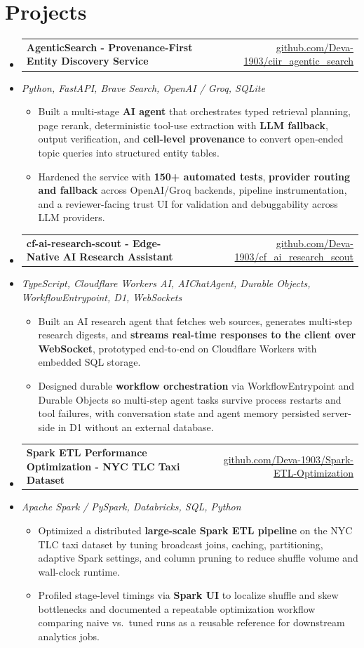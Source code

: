 \documentclass[letterpaper,10pt]{article}
\makeatletter
\newcommand{\resumeItem}[1]{
  \item\small{#1\vspace{-1pt}}
}
\newcommand{\resumeProjectHeading}[2]{
    \item
    \begin{tabular*}{0.985\textwidth}[t]{l@{\extracolsep{\fill}}r}
      \small\textbf{#1} & \small #2 \\
    \end{tabular*}\vspace{-5pt}
}
\newcommand{\resumeProjectSubheading}[1]{
  \vspace{-2pt}\item[] {\small\textcolor{ResumeSlate}{\emph{#1}}}\vspace{-3pt}
}
\newcommand{\resumeSubHeadingListStart}{\begin{itemize}[leftmargin=0.0in, label={}, itemsep=2pt, topsep=2pt]}
\newcommand{\resumeSubHeadingListEnd}{\end{itemize}}
\newcommand{\resumeItemListStart}{\begin{itemize}[leftmargin=0.18in, itemsep=2pt, topsep=1pt]}
\newcommand{\resumeItemListEnd}{\end{itemize}\vspace{-4pt}}
\makeatother
\begin{document}
\section{Projects}
\resumeSubHeadingListStart
  \resumeProjectHeading
    {AgenticSearch - Provenance-First Entity Discovery Service}
    {\href{https://github.com/Deva-1903/ciir_agentic_search}{github.com/Deva-1903/ciir\_agentic\_search}}
  \resumeProjectSubheading{Python, FastAPI, Brave Search, OpenAI / Groq, SQLite}
    \resumeItemListStart
      \resumeItem{Built a multi-stage \textbf{AI agent} that orchestrates typed retrieval planning, page rerank, deterministic tool-use extraction with \textbf{LLM fallback}, output verification, and \textbf{cell-level provenance} to convert open-ended topic queries into structured entity tables.}
      \resumeItem{Hardened the service with \textbf{150+ automated tests}, \textbf{provider routing and fallback} across OpenAI/Groq backends, pipeline instrumentation, and a reviewer-facing trust UI for validation and debuggability across LLM providers.}
    \resumeItemListEnd
  \resumeProjectHeading
    {cf-ai-research-scout - Edge-Native AI Research Assistant}
    {\href{https://github.com/Deva-1903/cf_ai_research_scout}{github.com/Deva-1903/cf\_ai\_research\_scout}}
  \resumeProjectSubheading{TypeScript, Cloudflare Workers AI, AIChatAgent, Durable Objects, WorkflowEntrypoint, D1, WebSockets}
    \resumeItemListStart
      \resumeItem{Built an AI research agent that fetches web sources, generates multi-step research digests, and \textbf{streams real-time responses to the client over WebSocket}, prototyped end-to-end on Cloudflare Workers with embedded SQL storage.}
      \resumeItem{Designed durable \textbf{workflow orchestration} via WorkflowEntrypoint and Durable Objects so multi-step agent tasks survive process restarts and tool failures, with conversation state and agent memory persisted server-side in D1 without an external database.}
    \resumeItemListEnd
  \resumeProjectHeading
    {Spark ETL Performance Optimization - NYC TLC Taxi Dataset}
    {\href{https://github.com/Deva-1903/Spark-ETL-Optimization}{github.com/Deva-1903/Spark-ETL-Optimization}}
  \resumeProjectSubheading{Apache Spark / PySpark, Databricks, SQL, Python}
    \resumeItemListStart
      \resumeItem{Optimized a distributed \textbf{large-scale Spark ETL pipeline} on the NYC TLC taxi dataset by tuning broadcast joins, caching, partitioning, adaptive Spark settings, and column pruning to reduce shuffle volume and wall-clock runtime.}
      \resumeItem{Profiled stage-level timings via \textbf{Spark UI} to localize shuffle and skew bottlenecks and documented a repeatable optimization workflow comparing naive vs.\ tuned runs as a reusable reference for downstream analytics jobs.}
    \resumeItemListEnd
\resumeSubHeadingListEnd
\vspace{-4pt}
\end{document}
